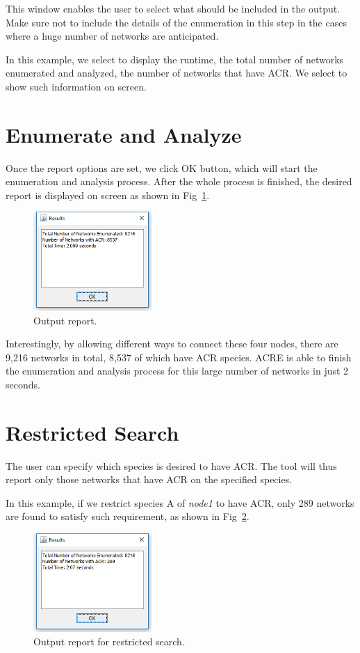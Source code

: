 \documentclass{report}
\begin{document}
This window enables the user to select what should be included in the output. Make sure not to
include the details of the enumeration in this step in the cases where a huge number of
networks are anticipated.

In this example, we select to display the runtime, the total number of networks enumerated and
analyzed, the number of networks that have ACR. We select to show such information on
screen.

\section{Enumerate and Analyze}

Once the report options are set, we click OK button, which will start the enumeration and
analysis process. After the whole process is finished, the desired report is displayed on screen as
shown in Fig~\ref{fig:10}.

\begin{figure}
	\centering
		\includegraphics[width=0.4\textwidth]{10}
	\caption{Output report.}
	\label{fig:10}
\end{figure}

Interestingly, by allowing different ways to connect these four nodes, there are 9,216 networks
in total, 8,537 of which have ACR species. ACRE is able to finish the enumeration and analysis
process for this large number of networks in just 2 seconds.

\section{Restricted Search}
The user can specify which species is desired to have ACR. The tool will thus report only those
networks that have ACR on the specified species.

In this example, if we restrict species A of \textit{node1} to have ACR, only 289 networks are found to
satisfy such requirement, as shown in Fig~\ref{fig:11}.

\begin{figure}
	\centering
		\includegraphics[width=0.4\textwidth]{11}
	\caption{Output report for restricted search.}
	\label{fig:11}
\end{figure}
\end{document}
